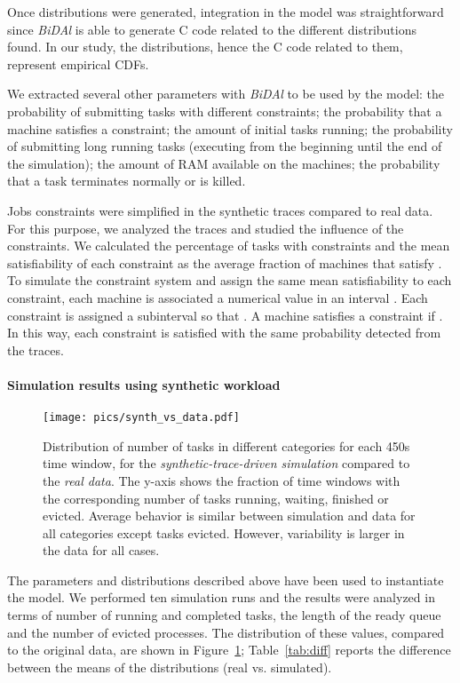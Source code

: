 \documentclass{article}
\begin{document}
Once distributions were generated, integration in the model was straightforward since \emph{BiDAl} is able to generate C code related to the different distributions found. In our study, the distributions, hence the C code related to them, represent empirical CDFs.

We extracted several other parameters with \emph{BiDAl} to be used by the model: the probability of submitting tasks with different constraints; the probability that a machine satisfies a constraint; the amount of initial tasks running; the probability of submitting long running tasks (executing from the beginning until the end of the simulation); the amount of RAM available on the machines; the probability that a task terminates normally or is killed.

Jobs constraints were simplified in the synthetic traces compared to real data. For this purpose, we analyzed the traces and studied the influence of the constraints. We calculated the percentage of tasks with constraints and the mean satisfiability  of each constraint  as the average fraction of machines that satisfy . To simulate the constraint system and assign the same mean satisfiability to each constraint, each machine is associated a numerical value  in an interval . Each constraint  is assigned a subinterval  so that . A machine satisfies a constraint  if . In this way, each constraint is satisfied with the same probability detected from the traces.


\paragraph{Simulation results using synthetic workload}

\begin{figure}
\centering
  \texttt{[image: pics/synth\_vs\_data.pdf]}
\caption{Distribution of number of tasks in different categories for each 450s time window, for the \emph{synthetic-trace-driven simulation} compared to the \emph{real data}. The y-axis shows the fraction of time windows with the corresponding number of tasks running, waiting, finished or evicted.  Average behavior is similar between simulation and data for all categories except tasks evicted. However, variability is larger in the data for all cases. }
\label{fig:diff}       
\end{figure}


The parameters and distributions described above have been used to instantiate the model.  We performed ten simulation runs and the results were analyzed in terms of number of running and completed tasks, the length of the ready queue and the number of evicted processes. The distribution of these values, compared to the original data, are shown in Figure~\ref{fig:diff}; Table~\ref{tab:diff} reports the difference between the means of the distributions (real vs. simulated). 
\end{document}
